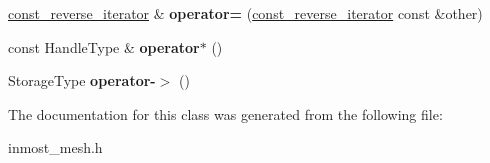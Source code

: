 \begin{DoxyCompactItemize}
\item 
\hypertarget{classINMOST_1_1ElementArray_1_1const__reverse__iterator_a649b02b1a0cce701e84a2756062bedd5}{\hyperlink{classINMOST_1_1ElementArray_1_1const__reverse__iterator}{const\-\_\-reverse\-\_\-iterator} \& {\bfseries operator=} (\hyperlink{classINMOST_1_1ElementArray_1_1const__reverse__iterator}{const\-\_\-reverse\-\_\-iterator} const \&other)}\label{classINMOST_1_1ElementArray_1_1const__reverse__iterator_a649b02b1a0cce701e84a2756062bedd5}

\item 
\hypertarget{classINMOST_1_1ElementArray_1_1const__reverse__iterator_ab7c6d555cc57f6227e46ec3f24431667}{const Handle\-Type \& {\bfseries operator$\ast$} ()}\label{classINMOST_1_1ElementArray_1_1const__reverse__iterator_ab7c6d555cc57f6227e46ec3f24431667}

\item 
\hypertarget{classINMOST_1_1ElementArray_1_1const__reverse__iterator_a333f2f1c103e22d487184f659b0a210f}{Storage\-Type {\bfseries operator-\/$>$} ()}\label{classINMOST_1_1ElementArray_1_1const__reverse__iterator_a333f2f1c103e22d487184f659b0a210f}

\end{DoxyCompactItemize}


The documentation for this class was generated from the following file\-:\begin{DoxyCompactItemize}
\item 
inmost\-\_\-mesh.\-h\end{DoxyCompactItemize}
